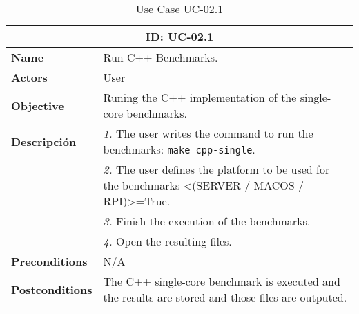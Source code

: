 \begin{table}[H]
    \centering
    \begin{tabular}{l p{10cm}}
        \toprule
        \multicolumn{2}{c}{\textbf{ID: UC-02.1}} \\
        \toprule
        \textbf{Name}                         &  Run C++ Benchmarks. \\
        \textbf{Actors}                       &  User \\
        \textbf{Objective}                    &  Runing the C++ implementation of the single-core benchmarks. \\
        \multirow{1}{*}{\textbf{Descripción}} & \textsl{1.} The user writes the command to run the benchmarks: \texttt{make cpp-single}.\\
                                              & \textsl{2.} The user defines the platform to be used for the benchmarks <(SERVER / MACOS / RPI)>=True.\\
                                              & \textsl{3.} Finish the execution of the benchmarks.\\
                                              & \textsl{4.} Open the resulting files.\\ 
        \textbf{Preconditions}                &  N/A \\
        \textbf{Postconditions}               &  The C++ single-core benchmark is executed and the results are stored and those files are outputed. \\
    \end{tabular}
    \caption{Use Case UC-02.1}
    \label{tab:uc-02.1}
\end{table}

